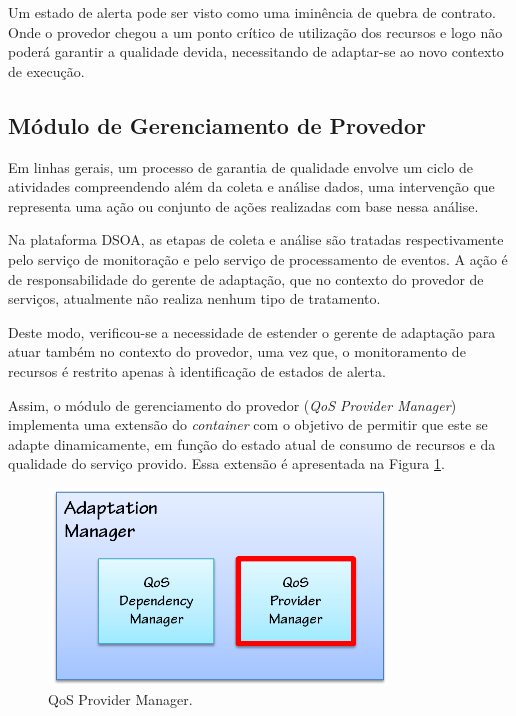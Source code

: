 Um estado de alerta pode ser visto como uma iminência de quebra de contrato. Onde o provedor chegou a um ponto crítico de utilização dos recursos e logo não poderá garantir a qualidade devida, necessitando de adaptar-se ao novo contexto de execução.

\subsection{Módulo de Gerenciamento de Provedor}
\label{subsec:qos_provider}
Em linhas gerais, um processo de garantia de qualidade envolve um ciclo de atividades compreendendo além da coleta e análise dados, uma intervenção que representa uma ação ou conjunto de ações realizadas com base nessa análise. 

Na plataforma DSOA, as etapas de coleta e análise são tratadas respectivamente pelo serviço de monitoração e pelo serviço de processamento de eventos. A ação é de responsabilidade do gerente de adaptação, que no contexto do provedor de serviços, atualmente não realiza nenhum tipo de tratamento.

Deste modo, verificou-se a necessidade de estender o gerente de adaptação para atuar também no contexto do provedor, uma vez que, o monitoramento de recursos é restrito apenas à identificação de estados de alerta.

Assim, o módulo de gerenciamento do provedor (\textit{QoS Provider Manager}) implementa uma extensão do \textit{container} com o  objetivo de permitir que este se adapte dinamicamente, em função do estado atual de consumo de recursos e da qualidade do serviço provido. Essa extensão é apresentada na Figura \ref{fig:adapt_module}.


\begin{figure}[htp]
\centering
\includegraphics[width=9cm]{chapters/chapter4/adaptation-manager.png}
\caption[QoS Provider Manager]{QoS Provider Manager.}
\label{fig:adapt_module}
\end{figure}

